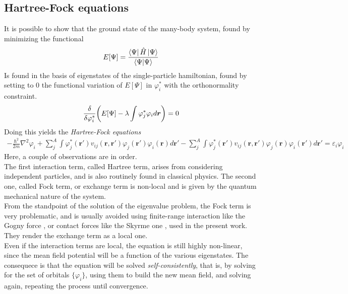 \subsection{Hartree-Fock equations}
It is possible to show \cite{ring2004nuclear} that the ground state of the many-body system, found by minimizing the functional
\begin{equation}
    \label{eq:functional_hf}
    E[\Psi] = \frac{\bra{\Psi} \hat H \ket{\Psi}}{\bra{\Psi} \ket{\Psi}}
\end{equation}
Is found in the basis of eigenstates of the single-particle hamiltonian, found by setting to $0$ the functional variation of $E[\Psi]$ in $\varphi_i^*$ with the orthonormality constraint.
\begin{equation}
    \label{eq:fdv_hf}
\fdv{}{\varphi_i^*} \bigg(E[\Psi] - \lambda \int \varphi_j^*\varphi_i d\bm r \bigg) = 0
\end{equation}
Doing this yields the \textit{Hartree-Fock equations}
\begin{align}
    \label{eq:hf_equations}
    -\frac{\hbar^2}{2m} \nabla^2 \varphi_i +\sum_{j}^A\int \varphi_j ^* (\bm r') v_{ij}(\bm r, \bm r')\varphi_j (\bm r') \varphi_i (\bm r) d\bm r' - \sum_j^A\int \varphi_j^* (\bm r') v_{ij}(\bm r, \bm r')\varphi_j (\bm r)\varphi_i (\bm r') d\bm r' = \varepsilon_i \varphi_i
\end{align}
Here, a couple of observations are in order.
\\The first interaction term, called Hartree term, arises from considering independent particles, and is also routinely found in classical physics. The second one, called Fock term, or exchange term is non-local and is given by the quantum mechanical nature of the system.
\\From the standpoint of the solution of the eigenvalue problem, the Fock term is very problematic, and is usually avoided using finite-range interaction like the Gogny force \cite{Robledo_2019}, or contact forces like the Skyrme one \cite{SKYRME1958615}, used in the present work. They render the exchange term as a local one.
\\Even if the interaction terms are local, the equation is still highly non-linear, since the mean field potential will be a function of the various eigenstates. The consequece is that the equation will be solved \textit{self-consistently}, that is, by solving for the set of orbitals $\{\varphi_i\}$, using them to build the new mean field, and solving again, repeating the process until convergence.
